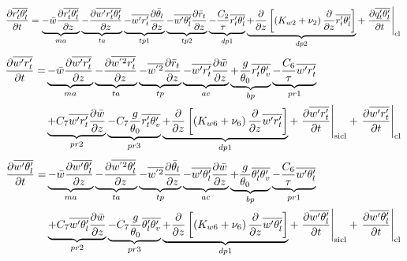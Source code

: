 \documentclass[11pt,fleqn]{article}
\newcommand{\ptlder}[2]{\frac{\partial #1}{\partial #2}}
\begin{document}
%
\begin{equation}
\label{eq_rtpthlp}
\ptlder{\overline{r'_t\theta'_l}}{t}
= \underbrace{ - \bar{w}\ptlder{\overline{r'_t\theta'_l}}{z} }_{ma}
  \underbrace{ - \ptlder{\overline{w'r'_t\theta'_l}}{z} }_{ta}
  \underbrace{ - \overline{w'r'_t}\ptlder{\bar{\theta}_l}{z} }_{tp1}
  \underbrace{ - \overline{w'\theta'_l}\ptlder{\bar{r}_t}{z} }_{tp2}
  \underbrace{ - \dfrac{C_2}{\tau} \overline{r_t' \theta_l'} }_{dp1}
  \underbrace{ + \ptlder{}{z} \left[ \left( K_{w2} + \nu_2 \right)
                        \ptlder{}{z} \overline{r_t' \theta_l'} 
                 \right] }_{dp2}
  + \left. \ptlder{\overline{q'_t\theta'_l}}{t} \right|_{\rm{cl}}
\end{equation}
%
\begin{equation}
\label{eq_wprtp}
\begin{split}
\ptlder{\overline{w'r'_t}}{t} 
= & \underbrace{ - \bar{w}\ptlder{\overline{w'r'_t}}{z} }_{ma}
    \underbrace{ - \ptlder{\overline{w^{'2}r'_t}}{z} }_{ta}
    \underbrace{ - \overline{w^{'2}}\ptlder{\bar{r}_t}{z} }_{tp}
    \underbrace{ - \overline{w'r'_t}\ptlder{\bar{w}}{z} }_{ac}
    \underbrace{ + \frac{g}{\theta_0} \overline{r'_t\theta'_v} }_{bp}
    \underbrace{ - \frac{C_6}{\tau}\overline{w'r'_t} }_{pr1} \\
  & \underbrace{ + C_7 \overline{w'r'_t}\ptlder{\bar{w}}{z} }_{pr2}
    \underbrace{ - C_7 \frac{g}{\theta_0} \overline{r'_t\theta'_v} }_{pr3}
    \underbrace{ + \ptlder{}{z} \left[ \left( K_{w6} + \nu_6 \right)
                          \ptlder{}{z} \overline{w'r'_t} 
                   \right] }_{dp1}
    + \left. \ptlder{\overline{w'r'_t}}{t} \right|_{\rm{sicl}}
    + \left. \ptlder{\overline{w'r'_t}}{t} \right|_{\rm{cl}}
\end{split}
\end{equation}
%
\begin{equation}
\label{eq_wpthlp}
\begin{split}
\ptlder{\overline{w'\theta'_l}}{t}
= & \underbrace{ - \bar{w}\ptlder{\overline{w'\theta'_l}}{z} }_{ma}	
    \underbrace{ - \ptlder{\overline{w^{'2}\theta'_l}}{z} }_{ta}
    \underbrace{ - \overline{w^{'2}}\ptlder{\bar{\theta}_l}{z} }_{tp}
    \underbrace{ - \overline{w'\theta'_l}\ptlder{\bar{w}}{z} }_{ac}
    \underbrace{ + \frac{g}{\theta_0} \overline{\theta'_l\theta'_v} }_{bp}
    \underbrace{ - \frac{C_6}{\tau}\overline{w'\theta'_l} }_{pr1} \\
  & \underbrace{ + C_7 \overline{w'\theta'_l}\ptlder{\bar{w}}{z} }_{pr2}
    \underbrace{ - C_7 \frac{g}{\theta_0} \overline{\theta'_l\theta'_v} }_{pr3}
    \underbrace{ + \ptlder{}{z} \left[ \left( K_{w6} + \nu_6 \right)
                          \ptlder{}{z} \overline{w'\theta'_l} 
                   \right] }_{dp1}
    + \left. \ptlder{\overline{w'\theta'_l}}{t} \right|_{\rm{sicl}}
    + \left. \ptlder{\overline{w'\theta'_l}}{t} \right|_{\rm{cl}}
\end{split}
\end{equation}
\end{document}
